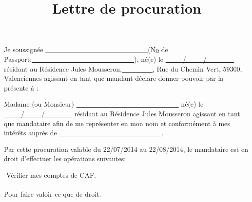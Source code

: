 \documentclass{article}
\title{Lettre de procuration}
\date{}
\begin{document}
\maketitle
\thispagestyle{empty}
\paragraph{}
Je soussign\'ee \underline{\ \ \ \ \ \ \ \ \ \ \ \ \ \ \ \ \ \ \ \ \ \ \ \ \ \ \ \ \ \ }(N\underline{o} de Passport:\underline{\ \ \ \ \ \ \ \ \ \ \ \ \ \ \ \ \ \ \ \ \ \ \ \ \ \ \ \ \ \ }), n\'e(e) le \underline{\ \ \ \ \ /\ \ \ \ \ /\ \ \ \ \ \ \ \ } r\'esidant au R\'esidence Jules Mousseron,\underline{\ \ \ \ \ \ \ \ \ }, Rue du Chemin Vert, 59300, Valenciennes agissant en tant que mandant d\'eclare donner pouvoir par la pr\'esente \`a :

Madame (ou Monsieur) \underline{\ \ \ \ \ \ \ \ \ \ \ \ \ \ \ \ \ \ \ \ \ \ \ \ \ \ \ \ \ \ } n\'e(e) le \underline{\ \ \ \ \ /\ \ \ \ \ /\ \ \ \ \ \ \ \ } r\'esidant au R\'esidence Jules Mousseron agissant en tant que mandataire afin de me repr\'esenter en mon nom et conform\'ement \`a mes int\'er\^ets aupr\`es de \underline{\ \ \ \ \ \ \ \ \ \ \ \ \ \ \ \ \ \ \ \ \ \ \ \ \ \ \ \ \ \ }.

Par cette procuration valable du 22/07/2014 au 22/08/2014, le mandataire est en droit d'effectuer les op\'erations suivantes:

-V\'erifier mes comptes de CAF.\\\\
Pour faire valoir ce que de droit.
\\\\\\\\
\\
\\
\\\\\\
\\
\\
\end{document}
